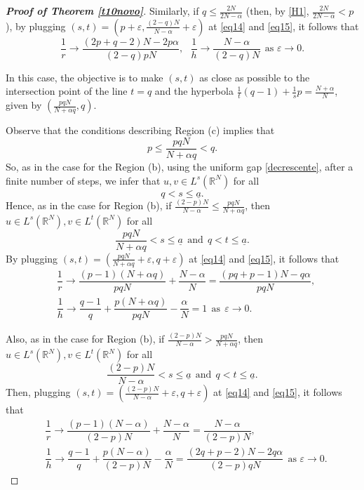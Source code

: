 \documentclass[12pt,a4paper]{article}
\numberwithin{equation}{section}
\begin{document}
\begin{proof}[\bf{Proof of Theorem \ref{t10novo}}]
Similarly, if $q \leq \frac{2N}{2N - \alpha}$ (then, by \eqref{H1}, $\frac{2N}{2N - \alpha} < p$ ), by plugging $(s,t) = \left( p+ \varepsilon , \frac{(2-q)N}{N-\alpha} +\varepsilon\right)$ at \eqref{eq14} and \eqref{eq15}, it follows that
\[
\dfrac{1}{r} \to \dfrac{(2p+q-2)N - 2p\alpha}{(2-q)pN} , \ \ \  \dfrac{1}{h} \to   \dfrac{N-\alpha}{(2-q)N} \ \ \text{as $\varepsilon \to 0$.}
\]

 In this case, the objective is to make $(s,t)$ as close as possible to the intersection point of the line $t=q$ and the hyperbola $
\frac{1}{t}(q-1)+\frac{1}{s}p=\frac{N+\alpha}{N}$, given by $\left(\frac{pqN}{N+\alpha q}, q\right)$. 

Observe that the conditions describing Region (c) implies that
\[
p \leq \frac{pqN}{N+\alpha q}<q.
\]
So, as in the case for the Region (b), using the uniform gap \eqref{decrescente}, after a finite number of steps, we infer that $u, v \in L^s(\mathbb{R}^N)$ for all
\[
q < s \leq \underline{a}.
\]
Hence, as in the case for Region (b), if $\frac{(2-p)N}{N-\alpha} \leq \frac{pqN}{N + \alpha q}$, then $u \in L^s(\mathbb{R}^N), v \in L^{t}(\mathbb{R}^N)$ for all
\[
\dfrac{pqN}{N + \alpha q} < s \leq \underline{a} \ \ \text{and} \ \ q< t \leq \underline{a}.
\]
By plugging $(s,t) = \left( \frac{pqN}{N + \alpha q} +\varepsilon, q +\varepsilon \right)$ at \eqref{eq14} and \eqref{eq15}, it follows that
\begin{align*}
&\dfrac{1}{r} \to \dfrac{(p-1)(N +\alpha q)}{pqN} + \dfrac{N-\alpha}{N} = \dfrac{(pq+p-1)N -q \alpha}{pqN}, \\
& \dfrac{1}{h} \to \dfrac{q-1}{q} + \dfrac{p(N + \alpha q)}{pqN} - \dfrac{\alpha}{N} = 1 \ \ \text{as} \ \ \varepsilon \to 0.
\end{align*}

Also, as in the case for Region (b), if $\frac{(2-p)N}{N-\alpha} > \frac{pqN}{N + \alpha q}$, then $u \in L^s(\mathbb{R}^N), v \in L^{t}(\mathbb{R}^N)$ for all
\[
\dfrac{(2-p)N}{N - \alpha} < s \leq \underline{a} \ \ \text{and} \ \ q< t \leq \underline{a}.
\]
Then, plugging $(s,t) = \left( \frac{(2-p)N}{N-\alpha} +\varepsilon, q +\varepsilon \right)$ at \eqref{eq14} and \eqref{eq15}, it follows that
\begin{align*}
&\dfrac{1}{r} \to \dfrac{(p-1)(N-\alpha)}{(2-p)N} + \dfrac{N-\alpha}{N} = \dfrac{N-\alpha}{(2-p)N}, \\ & \dfrac{1}{h} \to \dfrac{q-1}{q} + \dfrac{p(N -\alpha)}{(2-p)N} - \dfrac{\alpha}{N} = \dfrac{(2q+p-2)N - 2q\alpha}{(2-p)qN} \ \ \text{as $\varepsilon \to 0$.}
\end{align*}


\end{proof}
\end{document}
